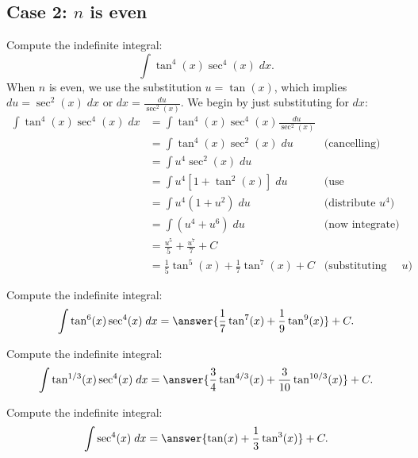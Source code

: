 \documentclass{ximera}
\begin{document}
\subsection{Case 2: $n$ is even}
\begin{example}
Compute the indefinite integral:
\[
\int \tan^4(x) \sec^4(x)\;dx.
\]
When $n$ is even, we use the substitution $u = \tan(x)$,
which implies $du = \sec^2(x) \; dx$ or $dx = \frac{du}{\sec^2(x)}$.
We begin by just substituting for $dx$:
\begin{align*}
\int \tan^4(x) \sec^4(x)\;dx &= \int \tan^4(x) \sec^4(x) \frac{du}{\sec^2(x)}\\
&= \int \tan^4(x) \sec^2(x) \; du & \text{(cancelling)}\\
&= \int u^4 \sec^2(x) \; du \\
&= \int u^4\left[1 + \tan^2(x)\right] \; du & \text{(use Pythagorean identity)}\\
&= \int u^4(1+u^2) \; du & \text{(distribute $u^4$)}\\
&= \int (u^4 + u^6) \; du & \text{(now integrate)}\\
&=  \frac{u^5}{5} + \frac{u^7}{7} + C  \\
&= \frac15\tan^5(x)  + \frac17 \tan^7(x) + C & \text{(substituting for $u$)}
\end{align*}
\end{example}

\begin{problem}
Compute the indefinite integral:
\[
\int \tan^6(x) \sec^4(x)\;dx = \answer{\frac17 \tan^7(x) + \frac19 \tan^9(x)} + C.
\]
\end{problem}

\begin{problem}
Compute the indefinite integral:
\[
\int \tan^{1/3}(x) \sec^4(x)\;dx = \answer{\frac34 \tan^{4/3}(x) + \frac{3}{10} \tan^{10/3}(x)} + C.
\]
\end{problem}

\begin{problem}
Compute the indefinite integral:
\[
\int  \sec^4(x)\;dx = \answer{\tan(x) + \frac13 \tan^3(x)} + C.
\]
\end{problem}
\end{document}
